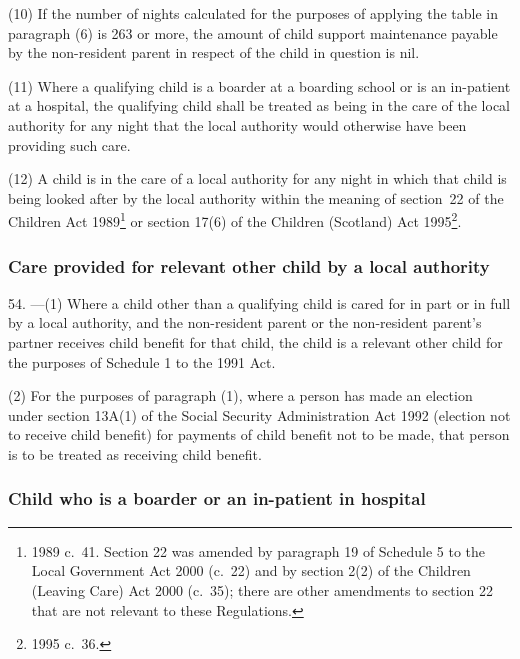 \documentclass[12pt,a4paper]{article}
\begin{document}
(10) If the number of nights calculated for the purposes of applying the table in paragraph (6) is 263 or more, the amount of child support maintenance payable by the non-resident parent in respect of the child in question is nil.

(11) Where a qualifying child is a boarder at a boarding school or is an in-patient at a hospital, the qualifying child shall be treated as being in the care of the local authority for any night that the local authority would otherwise have been providing such care.

(12) A child is in the care of a local authority for any night in which that child is being looked after by the local authority within the meaning of section~22 of the Children Act 1989\footnote{1989 c.~41. Section 22 was amended by paragraph 19 of Schedule 5 to the Local Government Act 2000 (c.~22) and by section 2(2) of the Children (Leaving Care) Act 2000 (c.~35); there are other amendments to section 22 that are not relevant to these Regulations.} or section 17(6) of the Children (Scotland) Act 1995\footnote{1995 c.~36.}.

\subsubsection[54. Care provided for relevant other child by a local authority]{Care provided for relevant other child by a local authority}

54.%
---(1)  %
  Where a child other than a qualifying child is cared for in part or in full by a local authority, and the non-resident parent or the non-resident parent’s partner receives child benefit for that child, the child is a relevant other child for the purposes of Schedule 1 to the 1991 Act.

(2) For the purposes of paragraph (1), where a person has made an election under section 13A(1) of the Social Security Administration Act 1992 (election not to receive child benefit) for payments of child benefit not to be made, that person is to be treated as receiving child benefit.


\subsubsection[55. Child who is a boarder or an in-patient in hospital]{Child who is a boarder or an in-patient in hospital}
\end{document}
